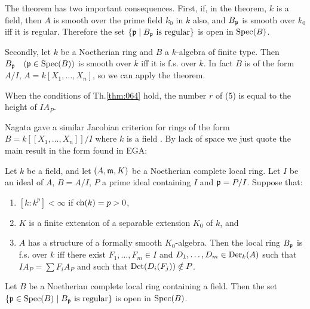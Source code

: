 \documentclass[../main]{subfiles}
\begin{document}
\begin{remark}
The theorem has two important consequences. First, if, in the theorem, $k$ is a field, then $A$ is smooth over the prime field $k_0$ in $k$ also, and $B_{\mathfrak{p}}$ is smooth over $k_0$ iff it is regular. Therefore the set $\{\mathfrak{p} \mid B_{\mathfrak{p}} \text { is regular}\}$ is open in $\operatorname{Spec}(B)$.

Secondly, let $k$ be a Noetherian ring and $B$ a $k$-algebra of finite type. Then $B_{\ideal p}\for{\ideal p \in \Spec(B)}$ is smooth over $k$ iff it is f.s. over $k$. In fact $B$ is of the form $A/I$, $A = k[X_1, \ldots, X_n]$, so we can apply the theorem.
\end{remark}

\begin{remark}
When the conditions of Th.\ref{thm:064} hold, the number $r$ of (5) is equal to the height of $I A_P$.
\end{remark}

\newparagraph Nagata gave a similar Jacobian criterion for rings of the form $B = k[[X_1, \ldots, X_n]]/I$ where $k$ is a field . By lack of space we just quote the main result in the form found in EGA:

\begin{theorem*}
Let $k$ be a field, and let $(A, \mathfrak{m}, K)$ be a Noetherian complete local ring. Let $I$ be an ideal of $A$, $B = A/I$, $P$ a prime ideal containing $I$ and $\mathfrak{p} = P/I$. Suppose that: 

\begin{enumerate}
    \item[(1)] $[k : k^p] < \infty$ if $\operatorname{ch}(k) = p > 0$,
    \item[(2)] $K$ is a finite extension of a separable extension $K_0$ of $k$, and
    \item[(3)] $A$ has a structure of a formally smooth $K_0$-algebra. Then the local ring $B_{\mathfrak{p}}$ is f.s. over $k$ iff there exist $F_1, \ldots, F_m \in I$ and $D_1, \dots, D_m \in \operatorname{Der}_k(A)$ such that $I A_P = \sum F_i A_P$ and such that $\operatorname{Det}(D_i(F_j)) \notin P$.
\end{enumerate}
\end{theorem*}

\begin{corollary}\label{cor:29.02}
Let $B$ be a Noetherian complete local ring containing a field. Then the set $\{\mathfrak{p} \in \operatorname{Spec}(B) \mid B_{\mathfrak{p}} \text { is regular}\}$ is open in $\operatorname{Spec}(B)$. 
\end{corollary}
\end{document}
